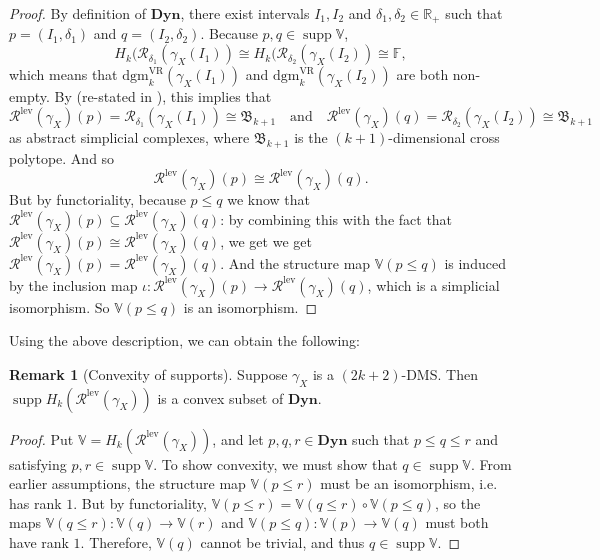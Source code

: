 \documentclass[a4paper,UKenglish,thm-restate]{article}
\theoremstyle{definition}
\newtheorem{remark}[theorem]{Remark}
\def\bbv{\mathbb{V}}
\def\bdyn{\mathbf{Dyn}}
\DeclareMathOperator{\supp}{supp}
\begin{document}
    \begin{proof}
        By definition of $\bdyn$, there exist intervals $I_1, I_2$ and $\delta_1, \delta_2 \in \mathbb{R}_+$ such that $p = (I_1, \delta_1)$ and $q = (I_2, \delta_2)$. Because $p, q \in \supp \bbv$,
        \[H_k(\mathcal{R}_{\delta_1}(\gamma_X(I_1)) \cong H_k(\mathcal{R}_{\delta_2}(\gamma_X(I_2)) \cong \mathbb{F},\]
        which means that $\mathrm{dgm}_k^{\mathrm{VR}}(\gamma_X(I_1))$ and $\mathrm{dgm}_k^{\mathrm{VR}}(\gamma_X(I_2))$ are both non-empty. By \cite[Theorem 4.3]{curvaturesets} (re-stated in ), this implies that
        \[\mathcal{R}^{\mathrm{lev}}(\gamma_X)(p) = \mathcal{R}_{\delta_1}(\gamma_X(I_1)) \cong \mathfrak{B}_{k+1} \quad \mathrm{ and } \quad \mathcal{R}^{\mathrm{lev}}(\gamma_X)(q) = \mathcal{R}_{\delta_2}(\gamma_X(I_2)) \cong \mathfrak{B}_{k+1} \]
        as abstract simplicial complexes, where $\mathfrak{B}_{k+1}$ is the $(k+1)$-dimensional cross polytope. And so \[\mathcal{R}^{\mathrm{lev}}(\gamma_X)(p) \cong \mathcal{R}^{\mathrm{lev}}(\gamma_X)(q).\] But by functoriality, because $p \leq q$ we know that $\mathcal{R}^{\mathrm{lev}}(\gamma_X)(p) \subseteq \mathcal{R}^{\mathrm{lev}}(\gamma_X)(q)$: by combining this with the fact that $\mathcal{R}^{\mathrm{lev}}(\gamma_X)(p) \cong \mathcal{R}^{\mathrm{lev}}(\gamma_X)(q)$, we get we get $\mathcal{R}^{\mathrm{lev}}(\gamma_X)(p) = \mathcal{R}^{\mathrm{lev}}(\gamma_X)(q)$. And the structure map $\bbv(p \leq q)$ is induced by the inclusion map $\iota: \mathcal{R}^{\mathrm{lev}}(\gamma_X)(p) \rightarrow \mathcal{R}^{\mathrm{lev}}(\gamma_X)(q)$, which is a simplicial isomorphism. So $\bbv(p \leq q)$ is an isomorphism.
    \end{proof}
    Using the above description, we can obtain the following:
    \begin{remark}[Convexity of supports]\label{lem:suppconvexity}
        Suppose $\gamma_X$ is a $(2k+2)$-DMS. Then $\supp H_k(\mathcal{R}^{\mathrm{lev}}(\gamma_X))$ is a convex subset of $\bdyn$.
    \end{remark}
    \begin{proof}
        Put $\bbv = H_k(\mathcal{R}^{\mathrm{lev}}(\gamma_X))$, and let $p, q, r \in \bdyn$ such that $p \leq q \leq r$ and satisfying $p, r \in \supp \bbv$. To show convexity, we must show that $q \in \supp \bbv$. From earlier assumptions, the structure map $\bbv(p \leq r)$ must be an isomorphism, i.e. has rank $1$. But by functoriality, $\bbv(p \leq r) = \bbv(q \leq r) \circ \bbv(p \leq q)$, so the maps $\bbv(q \leq r): \bbv(q) \rightarrow \bbv(r)$ and $\bbv(p \leq q): \bbv(p) \rightarrow \bbv(q)$ must both have rank $1$. Therefore, $\bbv(q)$ cannot be trivial, and thus $q \in \supp \bbv$.
    \end{proof}
\end{document}
